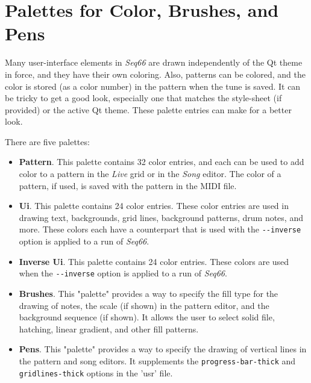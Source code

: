 %
%
%

\section{Palettes for Color, Brushes, and Pens}
\label{sec:palettes}

   Many user-interface elements in \textsl{Seq66} are drawn independently of
   the Qt theme in force, and they have their own coloring.  Also, patterns can
   be colored, and the color is stored (as a color number) in the pattern when
   the tune is saved.
   It can be tricky to get a good look, especially one that matches the
   style-sheet (if provided) or the active Qt theme.
   These palette entries can make for a better look.

   There are five palettes:

   \begin{itemize}
      \item \textbf{Pattern}.  This palette contains 32 color entries, and each
         can be used to add color to a pattern in the \textsl{Live} grid or in
         the \textsl{Song} editor.  The color of a pattern, if used, is saved
         with the pattern in the MIDI file.
      \item \textbf{Ui}.  This palette contains 24 color entries.  These
         color entries are used in drawing text, backgrounds, grid lines,
         background patterns, drum notes, and more.  These colors each have a
         counterpart that is used with the \texttt{-{}-inverse} option is
         applied to a run of \textsl{Seq66}.
      \item \textbf{Inverse Ui}.  This palette contains 24 color entries.
         These colors are used when the \texttt{-{}-inverse} option is applied
         to a run of \textsl{Seq66}.
      \item \textbf{Brushes}.  This "palette" provides a way to specify the
         fill type for the drawing of notes, the scale (if shown) in the
         pattern editor, and the background sequence (if shown).  It allows the
         user to select solid file, hatching, linear gradient, and other
         fill patterns.
      \item \textbf{Pens}.  This "palette" provides a way to specify the
         drawing of vertical lines in the pattern and song editors.
         It supplements the 
         \texttt{progress-bar-thick} and
         \texttt{gridlines-thick} options in the 'usr' file.
   \end{itemize}

